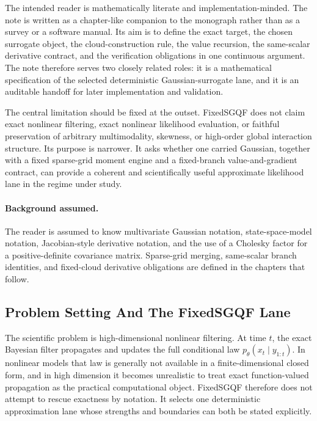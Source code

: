 \documentclass[11pt]{article}
\numberwithin{equation}{section}
\begin{document}
The intended reader is mathematically literate and implementation-minded.  The
note is written as a chapter-like companion to the monograph rather than as a
survey or a software manual.  Its aim is to define the exact target, the chosen
surrogate object, the cloud-construction rule, the value recursion, the
same-scalar derivative contract, and the verification obligations in one
continuous argument.  The note therefore serves two closely related roles: it is
a mathematical specification of the selected deterministic Gaussian-surrogate
lane, and it is an auditable handoff for later implementation and validation.

The central limitation should be fixed at the outset.  FixedSGQF does not claim
exact nonlinear filtering, exact nonlinear likelihood evaluation, or faithful
preservation of arbitrary multimodality, skewness, or high-order global
interaction structure.  Its purpose is narrower.  It asks whether one carried
Gaussian, together with a fixed sparse-grid moment engine and a fixed-branch
value-and-gradient contract, can provide a coherent and scientifically useful
approximate likelihood lane in the regime under study.

\paragraph{Background assumed.}
The reader is assumed to know multivariate Gaussian notation, state-space-model
notation, Jacobian-style derivative notation, and the use of a Cholesky factor
for a positive-definite covariance matrix.  Sparse-grid merging, same-scalar
branch identities, and fixed-cloud derivative obligations are defined in the
chapters that follow.

\tableofcontents

\subsection{Problem Setting And The FixedSGQF Lane}
\label{sec:p32-problem-lane}

The scientific problem is high-dimensional nonlinear filtering.  At time
\(t\), the exact Bayesian filter propagates and updates the full conditional law
\(p_\theta(x_t\mid y_{1:t})\).  In nonlinear models that law is generally not
available in a finite-dimensional closed form, and in high dimension it becomes
unrealistic to treat exact function-valued propagation as the practical
computational object.  FixedSGQF therefore does not attempt to rescue exactness
by notation.  It selects one deterministic approximation lane whose strengths and
boundaries can both be stated explicitly.
\end{document}
